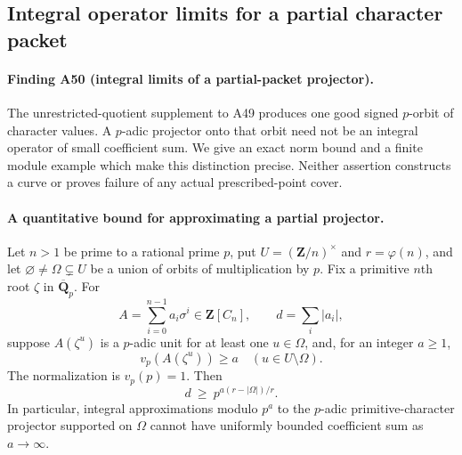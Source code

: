 \documentclass[11pt,a4paper]{article}
\begin{document}
\subsection{Integral operator limits for a partial character packet}
\label{sec:partial-packet-operators}

\paragraph{Finding A50 (integral limits of a partial-packet projector).}
The unrestricted-quotient supplement to A49 produces one good
signed $p$-orbit of character values. A $p$-adic projector onto
that orbit need not be an integral operator of small coefficient
sum. We give an exact norm bound and a finite module example
which make this distinction precise. Neither assertion constructs
a curve or proves failure of any actual prescribed-point cover.

\paragraph{A quantitative bound for approximating a partial projector.}
Let $n>1$ be prime to a rational prime $p$, put
$U=(\mathbf Z/n)^\times$ and $r=\varphi(n)$, and let
$\varnothing\ne\Omega\subsetneq U$ be a union of orbits of
multiplication by $p$. Fix a primitive $n$th root $\zeta$ in
$\overline{\mathbf Q}_p$. For
\[
 A=\sum_{i=0}^{n-1}a_i\sigma^i\in\mathbf Z[C_n],\qquad
                     d=\sum_i|a_i|,
 \tag{PP.1}
\]
suppose $A(\zeta^u)$ is a $p$-adic unit for at least one
$u\in\Omega$, and, for an integer $a\ge1$,
\[
                    v_p(A(\zeta^u))\ge a
                         \quad(u\in U\setminus\Omega).
 \tag{PP.2}
\]
The normalization is $v_p(p)=1$. Then
\[
                  d\ \ge\ p^{a(r-|\Omega|)/r}.
 \tag{PP.3}
\]
In particular, integral approximations modulo $p^a$ to the
$p$-adic primitive-character projector supported on $\Omega$
cannot have uniformly bounded coefficient sum as $a\to\infty$.
\end{document}
